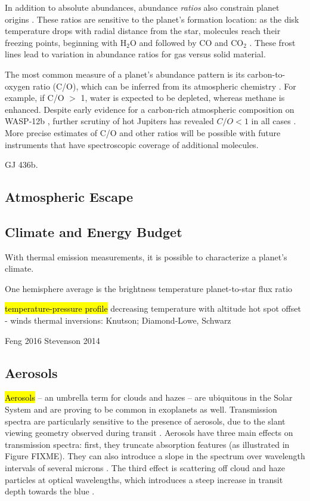 \documentclass[graybox,natbib,nosecnum]{svmult}
\newcommand{\hbindex}[1]{\hl{#1}\index{#1}}  %
\begin{document}
In addition to absolute abundances, abundance \emph{ratios} also constrain planet origins \citep{FIXME}. These ratios are sensitive to the planet's formation location: as the disk temperature drops with radial distance from the star, molecules reach their freezing points, beginning with H$_2$O and followed by CO and CO$_2$ \citep{oberg11}. These frost lines lead to variation in abundance ratios for gas versus solid material. 

The most common measure of a planet's abundance pattern is its carbon-to-oxygen ratio (C/O), which can be inferred from its atmospheric chemistry \citep{madhusudhan12}. For example, if C/O $>$ 1, water is expected to be depleted, whereas methane is enhanced.  Despite early evidence for a carbon-rich atmospheric composition on WASP-12b \citep{madhusudhan11}, further scrutiny of hot Jupiters has revealed $C/O < 1$ in all cases \citep{line14, kreidberg15b, benneke15}.  More precise estimates of C/O and other ratios will be possible with future instruments that have spectroscopic coverage of additional molecules. 

GJ 436b.

\subsection{Atmospheric Escape}

\subsection{Climate and Energy Budget}
With thermal emission measurements, it is possible to characterize a planet's climate. 

One  hemisphere average is the brightness temperature planet-to-star flux ratio 

\hbindex{temperature-pressure profile}
decreasing temperature with altitude
hot spot offset - winds
thermal inversions: Knutson; Diamond-Lowe, Schwarz

Feng 2016
Stevenson 2014


\subsection{Aerosols}
\hbindex{Aerosols} -- an umbrella term for clouds and hazes -- are ubiquitous in the Solar System and are proving to be common in exoplanets as well. Transmission spectra are particularly sensitive to the presence of aerosols, due to the slant viewing geometry observed during transit \citep{fortney05}.  Aerosols have three main effects on transmission spectra:  first, they truncate absorption features (as illustrated in Figure FIXME).  They can also introduce a slope in the spectrum over wavelength intervals of several microns \citep[e.g][]{sing16}.  The third effect is scattering off cloud and haze particles at optical wavelengths, which introduces a steep increase in transit depth towards the blue \citep[e.g.][]{pont08}.
\end{document}
